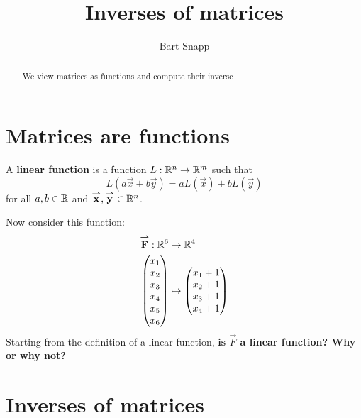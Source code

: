 \documentclass{ximera}
\author{Bart Snapp}
\title{Inverses of matrices}
\begin{document}
\begin{abstract}
  We view matrices as functions and compute their inverse
\end{abstract}
\maketitle

\section{Matrices are functions}

\begin{definition}
  A \textbf{linear function} is a function $L:\mathbb{R}^n\to\mathbb{R}^m$ such that
  \[
  L(a\vec{x}+b\vec{y}) = aL(\vec{x}) + bL(\vec{y})
  \]
  for all $a,b\in\mathbb{R}$ and ${\overset{\boldsymbol{\rightharpoonup}}{\mathbf{x}}}\hspace{0in},{\overset{\boldsymbol{\rightharpoonup}}{\mathbf{y}}}\hspace{0in}\in \mathbb{R}^n$.
\end{definition}

\begin{question}
  Now consider this function:
  \begin{align*}
    {\overset{\boldsymbol{\rightharpoonup}}{\mathbf{F}}}\hspace{0in}: \mathbb{R}^6 &\to \mathbb{R}^4\\
    \begin{pmatrix}
      x_1\\
      x_2\\
      x_3\\
      x_4\\
      x_5\\
      x_6
    \end{pmatrix}
    &\mapsto
        \begin{pmatrix}
      x_1+1\\
      x_2+1\\
      x_3+1\\
      x_4+1
    \end{pmatrix}
  \end{align*}
  Starting from the definition of a linear function, \textbf{is $\vec{F}$ a
  linear function? Why or why not?}
\end{question}



\section{Inverses of matrices}
\end{document}
